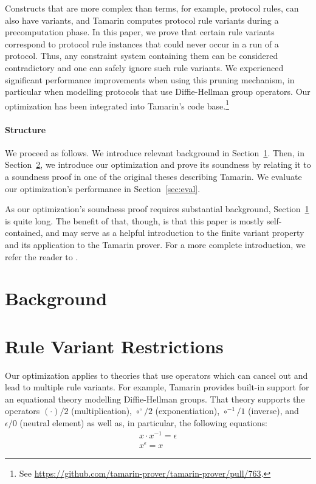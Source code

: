 \documentclass[envcountsame,orivec]{llncs}
\begin{document}
Constructs that are more complex than terms, for example, protocol rules, can also have variants, and Tamarin computes protocol rule variants during a precomputation phase.
In this paper, we prove that certain rule variants correspond to protocol rule instances that could never occur in a run of a protocol.
Thus, any constraint system containing them can be considered contradictory and one can safely ignore such rule variants.
We experienced significant performance improvements when using this pruning mechanism, in particular when modelling protocols that use Diffie-Hellman group operators.
Our optimization has been integrated into Tamarin's code base.\footnote{%
  See \url{https://github.com/tamarin-prover/tamarin-prover/pull/763}.
}

\paragraph{Structure}

We proceed as follows.
We introduce relevant background in Section~\ref{sec:bg}.
Then, in Section~\ref{sec:theory}, we introduce our optimization and prove its soundness by relating it to a soundness proof in one of the original theses describing Tamarin.
We evaluate our optimization's performance in Section~\ref{sec:eval}.

As our optimization's soundness proof requires substantial background, Section~\ref{sec:bg} is quite long.
The benefit of that, though, is that this paper is mostly self-contained, and may serve as a helpful introduction to the finite variant property and its application to the Tamarin prover.
For a more complete introduction, we refer the reader to \cite{Variants}.

\section{Background}
\label{sec:bg}



\section{Rule Variant Restrictions}
\label{sec:theory}

Our optimization applies to theories that use operators which can cancel out and lead to multiple rule variants.
For example, Tamarin provides built-in support for an equational theory modelling Diffie-Hellman groups.
That theory supports the operators $(\cdot)/2$ (multiplication), $\circ^\circ/2$ (exponentiation), $\circ^{-1}/1$ (inverse), and $\epsilon/0$ (neutral element) as well as, in particular, the following equations:
\begin{gather*}
  x \cdot x^{-1} = \epsilon \\
  x^\epsilon = x
\end{gather*}
\end{document}
